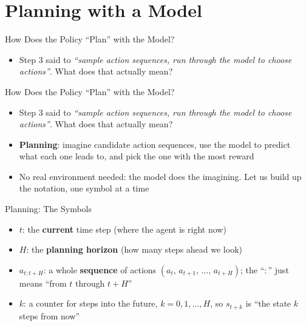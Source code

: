 \section{Planning with a Model}

\begin{frame}{How Does the Policy ``Plan'' with the Model?}
\begin{itemize}
    \item Step 3 said to \emph{``sample action sequences, run through the model
          to choose actions''}. What does that actually mean?
\end{itemize}
\end{frame}

\begin{frame}{How Does the Policy ``Plan'' with the Model?}
\begin{itemize}
    \item Step 3 said to \emph{``sample action sequences, run through the model
          to choose actions''}. What does that actually mean?
    \item \textbf{Planning}: imagine candidate action sequences, use the model to
          predict what each one leads to, and pick the one with the most reward
    \item No real environment needed: the model does the imagining. Let us
          build up the notation, one symbol at a time
\end{itemize}
\end{frame}

\begin{frame}{Planning: The Symbols}
\begin{itemize}
    \item $t$: the \textbf{current} time step (where the agent is right now)
    \item $H$: the \textbf{planning horizon} (how many steps ahead we look)
    \item $a_{t:t+H}$: a whole \textbf{sequence} of actions
          $(a_t,\, a_{t+1},\, \dots,\, a_{t+H})$; the ``$:$'' just means
          ``from $t$ through $t+H$''
    \item $k$: a counter for steps into the future, $k = 0, 1, \dots, H$,
          so $s_{t+k}$ is ``the state $k$ steps from now''
\end{itemize}
\end{frame}

